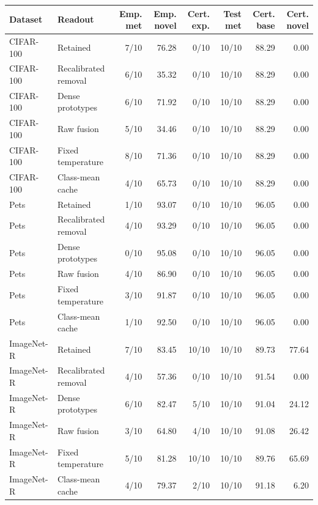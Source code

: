 \begin{tabular}{llrrrrrr}
\toprule
Dataset & Readout & Emp. met & Emp. novel & Cert. exp. & Test met & Cert. base & Cert. novel \\
\midrule
CIFAR-100 & Retained & 7/10 & 76.28 & 0/10 & 10/10 & 88.29 & 0.00 \\
CIFAR-100 & Recalibrated removal & 6/10 & 35.32 & 0/10 & 10/10 & 88.29 & 0.00 \\
CIFAR-100 & Dense prototypes & 6/10 & 71.92 & 0/10 & 10/10 & 88.29 & 0.00 \\
CIFAR-100 & Raw fusion & 5/10 & 34.46 & 0/10 & 10/10 & 88.29 & 0.00 \\
CIFAR-100 & Fixed temperature & 8/10 & 71.36 & 0/10 & 10/10 & 88.29 & 0.00 \\
CIFAR-100 & Class-mean cache & 4/10 & 65.73 & 0/10 & 10/10 & 88.29 & 0.00 \\
\midrule
Pets & Retained & 1/10 & 93.07 & 0/10 & 10/10 & 96.05 & 0.00 \\
Pets & Recalibrated removal & 4/10 & 93.29 & 0/10 & 10/10 & 96.05 & 0.00 \\
Pets & Dense prototypes & 0/10 & 95.08 & 0/10 & 10/10 & 96.05 & 0.00 \\
Pets & Raw fusion & 4/10 & 86.90 & 0/10 & 10/10 & 96.05 & 0.00 \\
Pets & Fixed temperature & 3/10 & 91.87 & 0/10 & 10/10 & 96.05 & 0.00 \\
Pets & Class-mean cache & 1/10 & 92.50 & 0/10 & 10/10 & 96.05 & 0.00 \\
\midrule
ImageNet-R & Retained & 7/10 & 83.45 & 10/10 & 10/10 & 89.73 & 77.64 \\
ImageNet-R & Recalibrated removal & 4/10 & 57.36 & 0/10 & 10/10 & 91.54 & 0.00 \\
ImageNet-R & Dense prototypes & 6/10 & 82.47 & 5/10 & 10/10 & 91.04 & 24.12 \\
ImageNet-R & Raw fusion & 3/10 & 64.80 & 4/10 & 10/10 & 91.08 & 26.42 \\
ImageNet-R & Fixed temperature & 5/10 & 81.28 & 10/10 & 10/10 & 89.76 & 65.69 \\
ImageNet-R & Class-mean cache & 4/10 & 79.37 & 2/10 & 10/10 & 91.18 & 6.20 \\
\bottomrule
\end{tabular}
